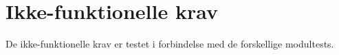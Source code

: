 
\section{Ikke-funktionelle krav}

De ikke-funktionelle krav er testet i forbindelse med de forskellige modultests.


%



